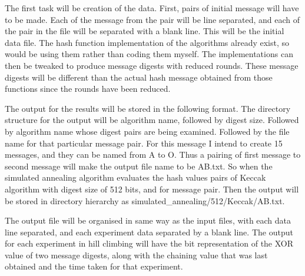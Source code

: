 \documentclass[12pt]{artikel3}                  %
\begin{document}
The first task will be creation of the data. First, pairs of initial message will have to be 
made. Each of the message from the pair will be line separated, and each of the pair in the file
will be separated with a blank line. This will be the initial data file. The hash function 
implementation of the algorithms already exist, so would be using them rather than coding them 
myself. The implementations can then be tweaked to produce message digests with reduced rounds. 
These message digests will be different than the actual hash message obtained from those functions 
since the rounds have been reduced.

The output for the results will be stored in the following format. The directory structure for the
output will be algorithm name, followed by digest size. Followed by algorithm name whose digest 
pairs are being examined. Followed by the file name for that particular message pair. For this message 
I intend to create 15 messages, and they can be named from A to O. Thus a pairing of first message to 
second message will make the output file name to be AB.txt. So when the simulated annealing algorithm 
evaluates the hash values pairs of Keccak algorithm with digest size of 512 bits, and for message pair.
Then the output will be stored in directory hierarchy as simulated\_annealing/512/Keccak/AB.txt.

The output file will be organised in same way as the input files, with each data line separated, and 
each experiment data separated by a blank line. The output for each experiment in hill climbing will
have the bit representation of the XOR value of two message digests, along with the chaining value
that was last obtained and the time taken for that experiment.
\end{document}
